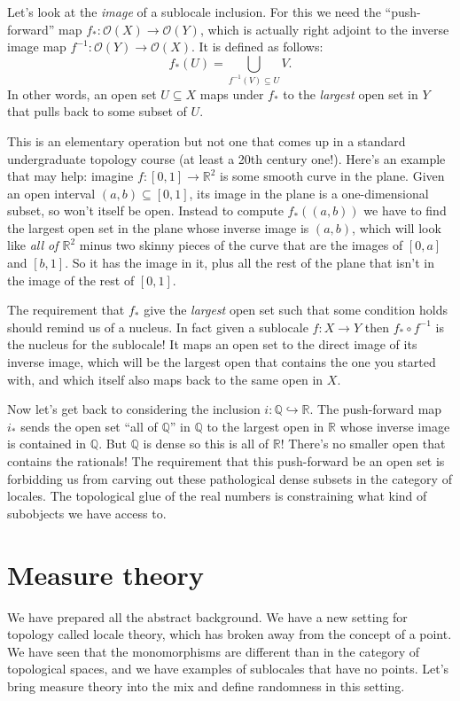 \documentclass[14pt]{extarticle}
\renewcommand{\o}{\ensuremath{\mathcal{O}}}
\begin{document}
Let's look at the \emph{image} of a sublocale inclusion. For this we need the ``push-forward'' map $f_*:\o(X)\to\o(Y)$, which is actually right adjoint to the inverse image map $f^{-1}:\o(Y)\to\o(X)$. It is defined as follows: $$f_*(U)=\bigcup_{f^{-1}(V)\subseteq U}V.$$ In other words, an open set $U\subseteq X$ maps under $f_*$ to the \emph{largest} open set in $Y$ that pulls back to some subset of $U$.

This is an elementary operation but not one that comes up in a standard undergraduate topology course (at least a 20th century one!). Here's an example that may help: imagine $f:[0,1]\to\mathbb{R}^2$ is some smooth curve in the plane. Given an open interval $(a,b)\subseteq[0,1]$, its image in the plane is a one-dimensional subset, so won't itself be open. Instead to compute $f_*((a,b))$ we have to find the largest open set in the plane whose inverse image is $(a,b)$, which will look like \emph{all of $\mathbb{R}^2$} minus two skinny pieces of the curve that are the images of $[0,a]$ and $[b,1]$. So it has the image in it, plus all the rest of the plane that isn't in the image of the rest of $[0,1]$.

The requirement that $f_*$ give the \emph{largest} open set such that some condition holds should remind us of a nucleus. In fact given a sublocale $f:X\to Y$ then $f_* \circ f^{-1}$ is the nucleus for the sublocale! It maps an open set to the direct image of its inverse image, which will be the largest open that contains the one you started with, and which itself also maps back to the same open in $X$.

Now let's get back to considering the inclusion $i:\mathbb{Q}\hookrightarrow\mathbb{R}$. The  push-forward map $i_*$ sends the open set ``all of $\mathbb{Q}$'' in $\mathbb{Q}$ to the largest open in $\mathbb{R}$ whose inverse image is contained in $\mathbb{Q}$. But $\mathbb{Q}$ is dense so this is all of $\mathbb{R}$! There's no smaller open that contains the rationals! The requirement that this push-forward be an open set is forbidding us from carving out these pathological dense subsets in the category of locales. The topological glue of the real numbers is constraining what kind of subobjects we have access to.

\section{Measure theory}

We have prepared all the abstract background. We have a new setting for topology called locale theory, which has broken away from the concept of a point. We have seen that the monomorphisms are different than in the category of topological spaces, and we have examples of sublocales that have no points. Let's bring measure theory into the mix and define randomness in this setting.
\end{document}
